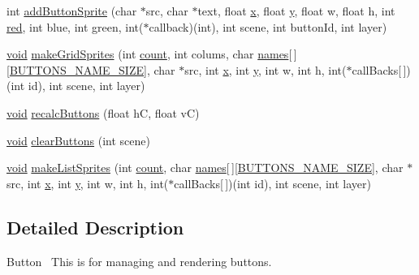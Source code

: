 \begin{DoxyCompactItemize}
\item 
int \hyperlink{group___button_ga1cc21e9739385e898f0293be8f5117f7}{add\+Button\+Sprite} (char $\ast$src, char $\ast$text, float \hyperlink{fmaths_8inl_a7ba8ab2f1e8f362163e17da3f15a5db9}{x}, float \hyperlink{fmaths_8inl_ad01ab75ae50a1a624185bfa014c66cfa}{y}, float w, float h, int \hyperlink{png_8h_a785e03b9f52b7b9ca5116a272adc908f}{red}, int blue, int green, int($\ast$callback)(int), int scene, int button\+Id, int layer)
\item 
\hyperlink{png_8h_ac9c84fa68bbad002983e35ce3663c686}{void} \hyperlink{group___button_ga7f94607d629b0da089c4d749a5d7f29d}{make\+Grid\+Sprites} (int \hyperlink{_core_8c_ad43c3812e6d13e0518d9f8b8f463ffcf}{count}, int colums, char \hyperlink{group___core_ga6341080327d9c3d3ef08fdccd4f05262}{names}\mbox{[}$\,$\mbox{]}\mbox{[}\hyperlink{group___button_ga5a86b4b0ec8a21993f74ae423ec74538}{B\+U\+T\+T\+O\+N\+S\+\_\+\+N\+A\+M\+E\+\_\+\+S\+I\+ZE}\mbox{]}, char $\ast$src, int \hyperlink{fmaths_8inl_a7ba8ab2f1e8f362163e17da3f15a5db9}{x}, int \hyperlink{fmaths_8inl_ad01ab75ae50a1a624185bfa014c66cfa}{y}, int w, int h, int($\ast$call\+Backs\mbox{[}$\,$\mbox{]})(int id), int scene, int layer)
\item 
\hyperlink{png_8h_ac9c84fa68bbad002983e35ce3663c686}{void} \hyperlink{group___button_ga47ed92e9fcdd1352bf86d899c7315a27}{recalc\+Buttons} (float hC, float vC)
\item 
\hyperlink{png_8h_ac9c84fa68bbad002983e35ce3663c686}{void} \hyperlink{group___button_ga9c75babf87b2f4f9ddde1401c1529118}{clear\+Buttons} (int scene)
\item 
\hyperlink{png_8h_ac9c84fa68bbad002983e35ce3663c686}{void} \hyperlink{group___button_gab89b3be508a45788fd33c1278f0c0268}{make\+List\+Sprites} (int \hyperlink{_core_8c_ad43c3812e6d13e0518d9f8b8f463ffcf}{count}, char \hyperlink{group___core_ga6341080327d9c3d3ef08fdccd4f05262}{names}\mbox{[}$\,$\mbox{]}\mbox{[}\hyperlink{group___button_ga5a86b4b0ec8a21993f74ae423ec74538}{B\+U\+T\+T\+O\+N\+S\+\_\+\+N\+A\+M\+E\+\_\+\+S\+I\+ZE}\mbox{]}, char $\ast$src, int \hyperlink{fmaths_8inl_a7ba8ab2f1e8f362163e17da3f15a5db9}{x}, int \hyperlink{fmaths_8inl_ad01ab75ae50a1a624185bfa014c66cfa}{y}, int w, int h, int($\ast$call\+Backs\mbox{[}$\,$\mbox{]})(int id), int scene, int layer)
\end{DoxyCompactItemize}


\subsection{Detailed Description}
Button~\newline
This is for managing and rendering buttons. 

